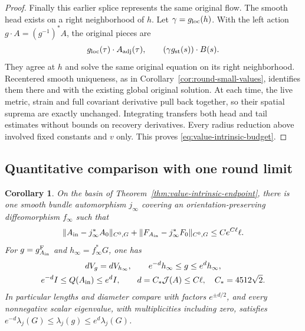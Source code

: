 \documentclass[11pt]{article}
\numberwithin{equation}{section}
\newtheorem{corollary}[theorem]{Corollary}
\theoremstyle{definition}
\theoremstyle{remark}
\begin{document}
\begin{proof}
Finally this earlier splice represents the same original
flow. The smooth head exists on a right neighborhood
of \(h\). Let \(\gamma=g_{\rm loc}(h)\). With the left
action \(g\cdot A=(g^{-1})^*A\), the original pieces are
\[
 g_{\rm loc}(\tau)\cdot A_{\rm adj}(\tau),
 \qquad (\gamma g_{\rm st}(s))\cdot B(s).
\]
They agree at \(h\) and solve the same original equation
on its right neighborhood. Recentered smooth uniqueness,
as in Corollary~\ref{cor:round-small-values}, identifies
them there and with the existing global original solution.
At each time, the live metric, strain and full covariant
derivative pull back together, so their spatial suprema
are exactly unchanged. Integrating transfers both head
and tail estimates without bounds on recovery derivatives.
Every radius reduction above involved fixed constants
and \(v\) only. This proves \eqref{eq:value-intrinsic-budget}.
\end{proof}

\subsection{Quantitative comparison with one round limit}
\label{subsec:quantitative-round-endpoint}

\begin{corollary}\label{cor:value-round-comparison}
On the basin of Theorem~\ref{thm:value-intrinsic-endpoint},
there is one smooth bundle automorphism \(j_\infty\)
covering an orientation-preserving diffeomorphism
\(f_\infty\) such that
\[
 \|A_{\rm in}-j_\infty^*A_0\|_{C^0,G}
 +\|F_{A_{\rm in}}-j_\infty^*F_0\|_{C^0,G}
                                          \le Ce^{C\ell}\ell .
\]
For \(g=g^{\rm F}_{A_{\rm in}}\) and
\(h_\infty=f_\infty^*G\), one has
\[
 \begin{gathered}
 dV_g=dV_{h_\infty},\qquad e^{-d}h_\infty\le g\le e^dh_\infty,\\
 e^{-d}I\le Q(A_{\rm in})\le e^dI,\qquad
 d=C_*\mathcal J(A)\le C\ell,\quad C_*=4512\sqrt2 .
 \end{gathered}
\]
In particular lengths and diameter compare with factors
\(e^{\pm d/2}\), and every nonnegative scalar eigenvalue,
with multiplicities including zero, satisfies
\(e^{-d}\lambda_j(G)\le\lambda_j(g)\le e^d\lambda_j(G)\).
\end{corollary}
\end{document}
